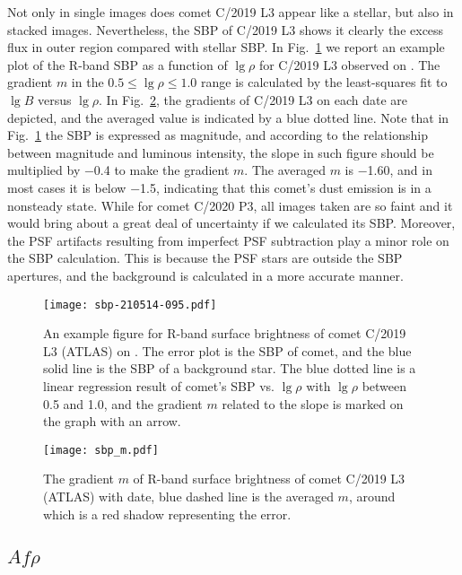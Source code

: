 Not only in single images does comet C/2019 L3 appear like a stellar, but also in stacked images. Nevertheless, the SBP of C/2019 L3 shows it clearly the excess flux in outer region compared with stellar SBP. In Fig.~\ref{fig:sbp} we report an example plot of the R-band SBP as a function of $\lg{\rho}$ for C/2019 L3 observed on . The gradient $m$ in the $0.5 \leqslant \lg{\rho} \leqslant 1.0$ range is calculated by the least-squares fit to $\lg{B}$ versus $\lg{\rho}$. 
In Fig.~\ref{fig:sbp_m}, the gradients of C/2019 L3 on each date are depicted, and the averaged value is indicated by a blue dotted line. 
Note that in Fig.~\ref{fig:sbp} the SBP is expressed as magnitude, and according to the relationship between magnitude and luminous intensity, the slope in such figure should be multiplied by \num{-0.4} to make the gradient $m$. The averaged $m$ is \num{-1.60}, and in most cases it is below \num{-1.5}, indicating that this comet's dust emission is in a nonsteady state. While for comet C/2020 P3, all images taken are so faint and it would bring about a great deal of uncertainty if we calculated its SBP. Moreover, the PSF artifacts resulting from imperfect PSF subtraction play a minor role on the SBP calculation. This is because the PSF stars are outside the SBP apertures, and the background is calculated in a more accurate manner. 

\begin{figure}
    \centering
    \texttt{[image: sbp-210514-095.pdf]}
    \caption{An example figure for R-band surface brightness of comet C/2019 L3 (ATLAS) on . The error plot is the SBP of comet, and the blue solid line is the SBP of a background star. The blue dotted line is a linear regression result of comet's SBP vs. $\lg{\rho}$ with $\lg{\rho}$ between 0.5 and 1.0, and the gradient $m$ related to the slope is marked on the graph with an arrow. }
    \label{fig:sbp}
\end{figure}

\begin{figure}
    \centering
    \texttt{[image: sbp\_m.pdf]}
    \caption{The gradient $m$ of R-band surface brightness of comet C/2019 L3 (ATLAS) with date, blue dashed line is the averaged $m$, around which is a red shadow representing the error. }
    \label{fig:sbp_m}
\end{figure}


\subsection{$Af\rho$}

